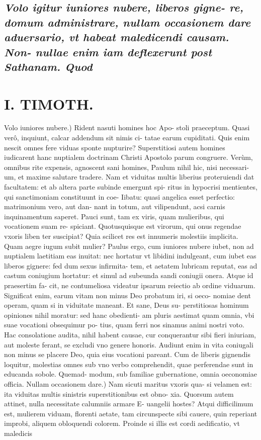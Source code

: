\documentclass{article}
\begin{document}
\begin{pages}
\subsection*{\textit{Volo igitur iuniores nubere, liberos gigne- re, domum administrare, nullam occasionem dare aduersario, vt habeat maledicendi causam. Non- nullae enim iam deflexerunt post Sathanam. Quod }}
\section*{I. TIMOTH. }
\marginpar{[ p.64 ]}\pstart Volo iuniores nubere.) Rident nasuti homines hoc Apo- stoli praeceptum. Quasi verô, inquiunt, calcar addendum sit nimis ci- tatae earum cupiditati. Quis enim nescit omnes fere viduas sponte nupturire? Superstitiosi autem homines iudicarent hanc nuptialem doctrinam Christi Apostolo parum congruere. Verùm, omnibus rite expensis, agnoscent sani homines, Paulum nihil hic, nisi necessari- um, et maxime salutare tradere. Nam et viduitas multis liberius proteruiendi dat facultatem: et ab altera parte subinde emergunt spi- ritus in hypocrisi mentientes, qui sanctimoniam constituunt in coe- Iibatu: quasi angelica esset perfectio: matrimonium vero, aut dan- nant in totum, aut vilipendunt, acsi carnis inquinamentum saperet. Pauci sunt, tam ex viris, quam mulieribus, qui vocationem suam re- spiciant. Quotusquisque est virorum, qui onus regendae vxoris liben ter suscipiat? Quia scilicet res est innumeris molestiis implicita. Quam aegre iugum subit mulier? Paulus ergo, cum iuniores nubere iubet, non ad nuptialem laetitiam eas inuitat: nec hortatur vt libidini indulgeant, cum iubet eas liberos gignere: fed dum sexus infirmita- tem, et aetatem lubricam reputat, eas ad castum coniugium hortatur: et simul ad subeunda sandi coniugii onera. Atque id praesertim fa- cit, ne contumeliosa videatur ipsarum reiectio ab ordine viduarum. Significat enim, earum vitam non minus Deo probatum iri, si oeco- nomiae dent operam, quam si in viduitate maneant. Et sane, Deus su- perstitiosas hominum opiniones nihil moratur: sed hanc obedienti- am pluris aestimat quam omnia, vbi suae vocationi obsequimur po- tius, quam ferri nos sinamus animi nostri voto. Hac consolatione audita, nihil habent causae, cur conquerantur sibi fieri iniuriam, aut moleste ferant, se excludi vno genere honoris. Audiunt enim in vita coniugali non minus se placere Deo, quia eius vocationi pareant. Cum de liberis gignendis loquitur, molestias omnes sub vno verbo comprehendit, quae perferendae sunt in educanda sobole. Quemad- modum, sub familiae gubernatione, omnia oeconomiae officia.  \pend\pstart Nullam occasionem dare.) Nam sicuti maritus vxoris qua- si velamen est: ita viduitas multis sinistris superstitionibus est obno- xia. Quorsum autem attinet, nulla necessitate calumniis armare E- uangelii hostes? Atqui difficilimum est, mulierem viduam, florenti aetate, tam circunspecte sibi cauere, quin reperiant improbi, aliquem obloquendi colorem. Proinde si illis est cordi aedificatio, vt maledicis  \pend
{}
{}

\end{pages}
\end{document}

